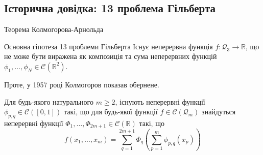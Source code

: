 \documentclass{zkdl-presentation-template}
\begin{document}
    \subsection{Історична довідка: 13 проблема Гільберта}
    
    \begin{frame}{Теорема Колмогорова-Арнольда}
        \begin{block}{Основна гіпотеза 13 проблеми Гільберта}
            Існує неперервна функція $f: \mathcal{Q}_3 \to \mathbb{R}$, що не може бути
            виражена як композиція та сума неперервних функцій $\phi_1,\dots,\phi_N \in
            \mathcal{C}(\mathbb{R}^2)$.
        \end{block}

        \pause Проте, у 1957 році Колмогоров показав обернене.

        \begin{definition}
            Для будь-якого натурального $m \geq 2$, існують неперервні функції
            $\phi_{p,q} \in \mathcal{C}([0,1])$ такі, що для будь-якої функції $f \in
            \mathcal{C}(\mathcal{Q}_m)$ знайдуться неперервні функції
            $\Phi_1,\dots,\Phi_{2m+1} \in \mathcal{C}(\mathbb{R})$ такі, що
            \begin{equation*}
                f(x_1,\dots,x_m) = \sum_{q=1}^{2m+1}\Phi_q\left(\sum_{p=1}^m \phi_{p,q}(x_p)\right)
            \end{equation*}
        \end{definition}
    \end{frame}
\end{document}
